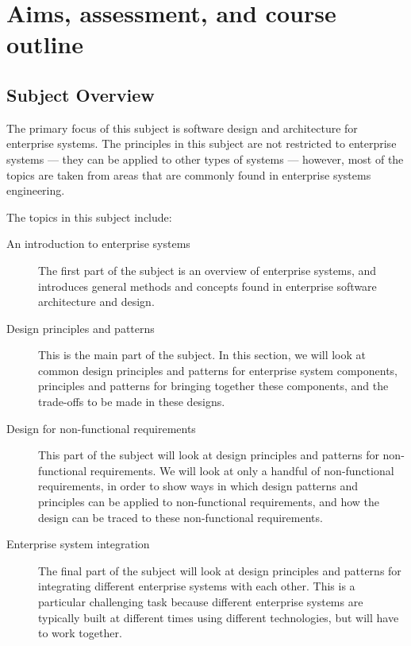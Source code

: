 \chapter*{Aims, assessment, and course outline}

\section*{Subject Overview}

The primary focus of this subject is software design and architecture for enterprise systems. The principles in this subject are not restricted to enterprise systems --- they can be applied to other types of systems --- however, most of the topics are taken from areas that are commonly found in enterprise systems engineering.

The topics in this subject include:

\begin{description}

\item[An introduction to enterprise systems] The first part of the subject is an overview of enterprise systems, and introduces general methods and concepts found in enterprise software architecture and design.

\item[Design principles and patterns] This is the main part of the subject. In this section, we will look at common design principles and patterns for enterprise system components,  principles and patterns for bringing together these components, and the trade-offs to be made in these designs.

\item[Design for non-functional requirements] This part of the subject will look at design principles and patterns for non-functional requirements. We will look at only a handful of non-functional requirements, in order to show ways in which design patterns and principles can be applied to non-functional requirements, and how the design can be traced to these non-functional requirements.

\item[Enterprise system integration] The final part of the subject will look at design principles and patterns for integrating different enterprise systems with each other. This is a particular challenging task because different enterprise systems are typically built at different times using different technologies, but will have to work together.

\end{description}

